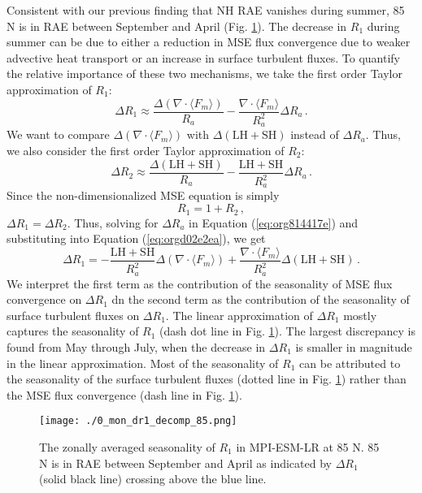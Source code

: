 \documentclass[11pt]{article}
\begin{document}
Consistent with our previous finding that NH RAE vanishes during summer, 85 N is in RAE between September and April (Fig. \ref{fig:orgcc87b58}). The decrease in \(R_1\) during summer can be due to either a reduction in MSE flux convergence due to weaker advective heat transport or an increase in surface turbulent fluxes. To quantify the relative importance of these two mechanisms, we take the first order Taylor approximation of \(R_1\):
\begin{equation}
\label{eq:orgd02e2ea}
\Delta R_1 \approx \frac{\Delta(\nabla\cdot\langle F_m\rangle)}{R_a} - \frac{\nabla\cdot\langle F_m\rangle}{R_a^2}\Delta R_a \, .
\end{equation}
We want to compare \(\Delta(\nabla\cdot\langle F_m \rangle)\) with \(\Delta (\mathrm{LH+SH})\) instead of \(\Delta R_a\). Thus, we also consider the first order Taylor approximation of \(R_2\):
\begin{equation}
\label{eq:org814417e}
\Delta R_2 \approx \frac{\Delta(\mathrm{LH+SH})}{R_a} - \frac{\mathrm{LH+SH}}{R_a^2}\Delta R_a \, .
\end{equation}
Since the non-dimensionalized MSE equation is simply
\begin{equation}
R_1 = 1 + R_2 \, ,
\end{equation}
\(\Delta R_1=\Delta R_2\). Thus, solving for \(\Delta R_a\) in Equation (\ref{eq:org814417e}) and substituting into Equation (\ref{eq:orgd02e2ea}), we get
\begin{equation}
\Delta R_1 = - \frac{\mathrm{LH + SH}}{R_a^2}\Delta(\nabla\cdot \langle F_m \rangle) + \frac{\nabla\cdot \langle F_m\rangle}{R_a^2}\Delta(\mathrm{LH+SH}) \, .
\end{equation}
We interpret the first term as the contribution of the seasonality of MSE flux convergence on \(\Delta R_1\) dn the second term as the contribution of the seasonality of surface turbulent fluxes on \(\Delta R_1\). The linear approximation of \(\Delta R_1\) mostly captures the seasonality of \(R_1\) (dash dot line in Fig. \ref{fig:orgcc87b58}). The largest discrepancy is found from May through July, when the decrease in \(\Delta R_1\) is smaller in magnitude in the linear approximation. Most of the seasonality of \(R_1\) can be attributed to the seasonality of the surface turbulent fluxes (dotted line in Fig. \ref{fig:orgcc87b58}) rather than the MSE flux convergence (dash line in Fig. \ref{fig:orgcc87b58}).

\begin{figure}[htbp]
\centering
\texttt{[image: ./0\_mon\_dr1\_decomp\_85.png]}
\caption{\label{fig:orgcc87b58}The zonally averaged seasonality of \(R_1\) in MPI-ESM-LR at 85 N. 85 N is in RAE between September and April as indicated by \(\Delta R_1\) (solid black line) crossing above the blue line.}
\end{figure}
\end{document}
